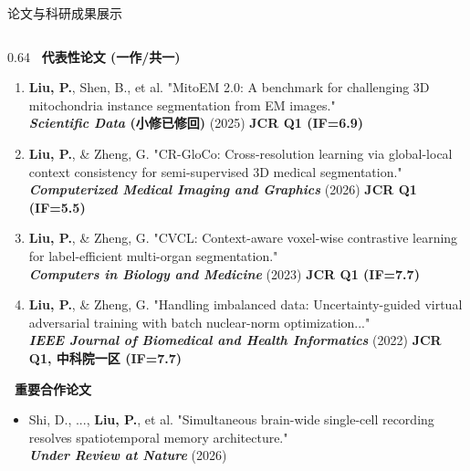 \documentclass[aspectratio=169, xcolor=table, 10pt]{beamer}
\begin{document}
\begin{frame}[shrink]{论文与科研成果展示}
\begin{columns}[T]
        \begin{column}{0.64\textwidth}
            \textbf{\normalsize \faBook\ 代表性论文 (一作/共一)}
            \vspace{0.3em}
            
            \scriptsize
            \begin{enumerate}
                \setlength\itemsep{0.5em}
                
                \item \textbf{Liu, P.}, Shen, B., et al. "MitoEM 2.0: A benchmark for challenging 3D mitochondria instance segmentation from EM images."\\
                \textcolor{myblue}{\textbf{\textit{Scientific Data} (小修已修回)}} (2025) \hfill \textcolor{myred}{\textbf{JCR Q1 (IF=6.9)}}
                
                \item \textbf{Liu, P.}, \& Zheng, G. "CR-GloCo: Cross-resolution learning via global-local context consistency for semi-supervised 3D medical segmentation."\\
                \textcolor{myblue}{\textbf{\textit{Computerized Medical Imaging and Graphics}}} (2026) \hfill \textcolor{myred}{\textbf{JCR Q1 (IF=5.5)}}
                
                \item \textbf{Liu, P.}, \& Zheng, G. "CVCL: Context-aware voxel-wise contrastive learning for label-efficient multi-organ segmentation."\\
                \textcolor{myblue}{\textbf{\textit{Computers in Biology and Medicine}}} (2023) \hfill \textcolor{myred}{\textbf{JCR Q1 (IF=7.7)}}
                
                \item \textbf{Liu, P.}, \& Zheng, G. "Handling imbalanced data: Uncertainty-guided virtual adversarial training with batch nuclear-norm optimization..."\\
                \textcolor{myblue}{\textbf{\textit{IEEE Journal of Biomedical and Health Informatics}}} (2022) \hfill \textcolor{myred}{\textbf{JCR Q1, 中科院一区 (IF=7.7)}}
                
            \end{enumerate}

            \vspace{0.5em}
            \textbf{\normalsize \faHandshake\ 重要合作论文}
            \vspace{0.3em}
            
            \begin{itemize}
                \item Shi, D., ..., \textbf{Liu, P.}, et al. "Simultaneous brain-wide single-cell recording resolves spatiotemporal memory architecture."\\
                \textcolor{myblue}{\textbf{\textit{Under Review at Nature}}} (2026)
            \end{itemize}
            
        \end{column}
    \end{columns}
\end{frame}
\end{document}
